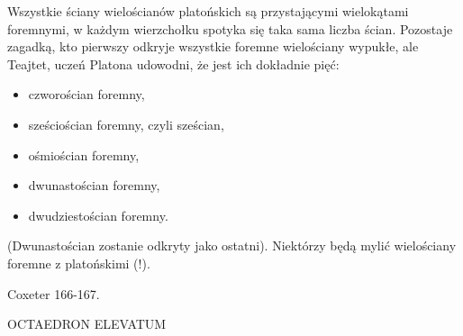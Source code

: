 %

Wszystkie ściany wielościanów platońskich są przystającymi wielokątami foremnymi, w każdym wierzchołku spotyka się taka sama liczba ścian.
Pozostaje zagadką, kto pierwszy odkryje wszystkie foremne wielościany wypukłe, ale Teajtet, uczeń Platona udowodni, że jest ich dokładnie pięć:
\begin{itemize}
\item czworościan foremny,
\item sześciościan foremny, czyli sześcian,
\item ośmiościan foremny,
\item dwunastościan foremny,
\item dwudziestościan foremny.
\end{itemize}

(Dwunastościan zostanie odkryty jako ostatni).
Niektórzy będą mylić wielościany foremne z platońskimi (!).

Coxeter 166-167.

OCTAEDRON ELEVATUM


%